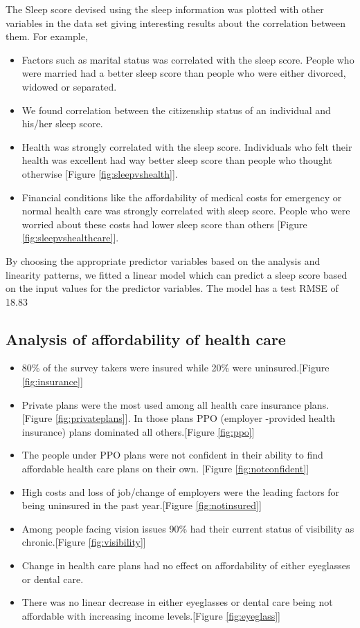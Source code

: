 \documentclass[12pt]{article}
\begin{document}
The Sleep score devised using the sleep information was plotted with other variables in the data set giving interesting results about the correlation between them. For example,
\begin{itemize}
    \item Factors such as marital status was correlated with the sleep score. People who were married had a better sleep score than people who were either divorced, widowed or separated.
    \item We found correlation between the citizenship status of an individual and his/her sleep score.
    \item Health was strongly correlated with the sleep score. Individuals who felt their health was excellent had way better sleep score than people who thought otherwise [Figure \ref{fig:sleepvshealth}].
    \item Financial conditions like the affordability of medical costs for emergency or normal health care was strongly correlated with sleep score. People who were worried about these costs had lower sleep score than others [Figure \ref{fig:sleepvshealthcare}].
\end{itemize}

By choosing the appropriate predictor variables based on the analysis and linearity patterns, we fitted a linear model which can predict a sleep score based on the input values for the predictor variables. The model has a test RMSE of 18.83

\subsection{Analysis of affordability of health care}
\begin{itemize}
    \item 80\% of the survey takers were insured while 20\% were uninsured.[Figure \ref{fig:insurance}]
    \item Private plans were the most used among all health care insurance plans.[Figure \ref{fig:privateplans}]. In those plans PPO (employer -provided health insurance) plans dominated all others.[Figure \ref{fig:ppo}]
    \item The people under PPO plans were not confident in their ability to find affordable health care plans on their own. [Figure \ref{fig:notconfident}]
    \item High costs and  loss of job/change of employers were the leading factors for being uninsured in the past year.[Figure \ref{fig:notinsured}]
    \item Among people facing vision issues 90\% had their current status of visibility as chronic.[Figure \ref{fig:visibility}]
    \item Change in health care plans had no effect on affordability of either eyeglasses or dental care.
    \item There was no linear decrease in either eyeglasses or dental care being not affordable with increasing income levels.[Figure \ref{fig:eyeglass}]
\end{itemize}
\end{document}
